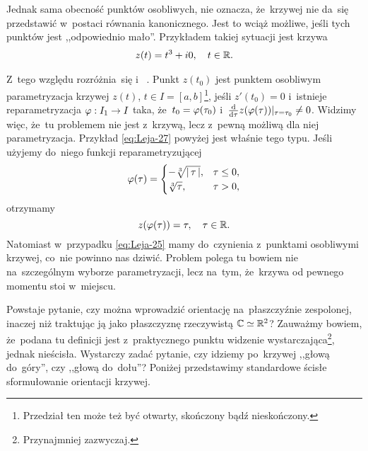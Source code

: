 \documentclass[a4paper,11pt]{article}
\begin{document}
Jednak sama obecność punktów osobliwych, nie oznacza, że~krzywej nie
da~się przedstawić w~postaci równania kanonicznego. Jest to wciąż
możliwe, jeśli tych punktów jest ,,odpowiednio mało''. Przykładem
takiej sytuacji jest krzywa
\begin{equation}
  \label{eq:Leja-27}
  \begin{split}
    z( t ) = t^{ 3 } + i 0, \quad t \in \mathbb{R}.
  \end{split}
\end{equation}

Z~tego względu rozróżnia~się  i~
\cite{GdowskiElementGeometriiRozniczkowejZZadaniami99}. Punkt
$z( t_{ 0 } )$ jest punktem osobliwym parametryzacja krzywej $z( t )$,
$t \in I = [ a, b ]$\footnote{Przedział ten może też być otwarty,
  skończony bądź nieskończony.}, jeśli $z'( t_{ 0 } ) = 0$ i~istnieje
reparametryzacja $\varphi: I_{ 1 } \to I$ taka,
że~$t_{ 0 } = \varphi( \tau_{ 0 } )$
i~$\tfrac{ \mathrm{d} }{ \mathrm{d} \tau } z( \varphi( \tau ) )|_{ \tau = \tau_{ 0 } }
\neq 0$. Widzimy więc, że~tu problemem nie jest z~krzywą, lecz z~pewną
możliwą dla niej parametryzacja. Przykład \eqref{eq:Leja-27} powyżej
jest właśnie tego typu. Jeśli użyjemy do~niego funkcji
reparametryzującej
\begin{equation}
  \label{eq:Leja-28}
  \varphi( \tau ) =
  \begin{cases}
    -\sqrt[3]{ \left| \,  \tau  \, \right| }, & \tau \leq 0, \\
    \sqrt[3]{ \tau }, & \tau > 0,
  \end{cases}
\end{equation}
otrzymamy
\begin{equation}
  \label{eq:Leja-29}
  z( \varphi( \tau ) ) = \tau, \quad \tau \in \mathbb{R}.
\end{equation}
Natomiast w~przypadku \eqref{eq:Leja-25} mamy do~czynienia z~punktami
osobliwymi krzywej, co~nie powinno nas dziwić. Problem polega tu
bowiem nie na~szczególnym wyborze parametryzacji, lecz na~tym,
że~krzywa od pewnego momentu stoi w~miejscu.

\vspace{\spaceFour}


\start {} Powstaje pytanie, czy można wprowadzić orientację
na~płaszczyźnie zespolonej, inaczej niż traktując ją jako płaszczyznę
rzeczywistą $\mathbb{C} \simeq \mathbb{R}^{ 2 }$? Zauważmy bowiem, że~podana tu
definicji jest z~praktycznego punktu widzenie
wystarczająca\footnote{Przynajmniej zazwyczaj.}, jednak nieścisła.
Wystarczy zadać pytanie, czy idziemy po~krzywej ,,głową do~góry'', czy
,,głową do~dołu''? Poniżej przedstawimy standardowe ścisłe
sformułowanie orientacji krzywej.
\end{document}
